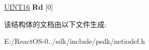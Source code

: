 \begin{DoxyCompactItemize}
\begin{tabbing}
\end{tabbing}\item 
\mbox{\label{struct___s_o_u_r_c_e_r_o_u_t_e___h_e_a_d_e_r_ac1c4a59afc01c906c4d56f5a6a0d875c}} 
\hyperlink{_processor_bind_8h_a09f1a1fb2293e33483cc8d44aefb1eb1}{U\+I\+N\+T16} {\bfseries Rd} \mbox{[}0\mbox{]}
\end{DoxyCompactItemize}


该结构体的文档由以下文件生成\+:\begin{DoxyCompactItemize}
\item 
E\+:/\+React\+O\+S-\/0../sdk/include/psdk/netiodef.\+h\end{DoxyCompactItemize}
